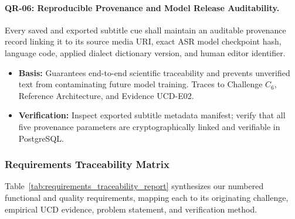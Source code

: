 \documentclass[a4paper,11pt]{article}
\begin{document}
\paragraph{QR-06: Reproducible Provenance and Model Release Auditability.}
Every saved and exported subtitle cue shall maintain an auditable provenance record linking it to its source media URI, exact ASR model checkpoint hash, language code, applied dialect dictionary version, and human editor identifier.
\begin{itemize}
    \item \textbf{Basis:} Guarantees end-to-end scientific traceability and prevents unverified text from contaminating future model training. Traces to Challenge $C_6$, Reference Architecture, and Evidence UCD-E02.
    \item \textbf{Verification:} Inspect exported subtitle metadata manifest; verify that all five provenance parameters are cryptographically linked and verifiable in PostgreSQL.
\end{itemize}

\subsubsection{Requirements Traceability Matrix}
\label{sec:chap3_req_matrix}
Table~\ref{tab:requirements_traceability_report} synthesizes our numbered functional and quality requirements, mapping each to its originating challenge, empirical UCD evidence, problem statement, and verification method.
\end{document}
